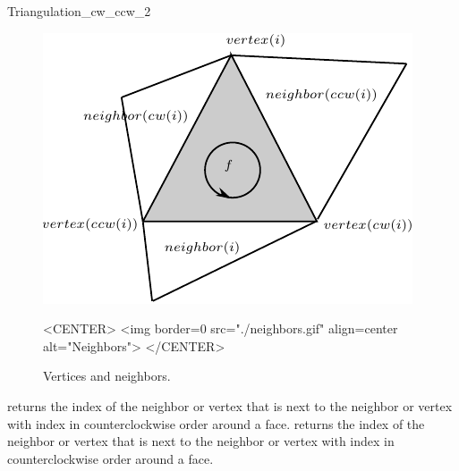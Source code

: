 \begin{ccRefClass}{Triangulation_cw_ccw_2}
 \begin{figure}
\begin{ccTexOnly}
    \begin{center}
     \includegraphics{Triangulation_2/neighbors}
    \end{center}
\end{ccTexOnly} 
    \caption{Vertices and neighbors.
    \label{Triangulation_ref_Fig_neighbors_bis}}
  \begin{ccHtmlOnly}
<CENTER>
<img border=0 src="./neighbors.gif" align=center alt="Neighbors">
</CENTER>
\end{ccHtmlOnly} 
\end{figure}




\ccCreation
{}  %


\ccOperations
{}
{returns the index of the  neighbor or vertex that is  next to 
the neighbor or vertex with index 
in counterclockwise order around a face.}
\ccGlue
{}
{returns the index of the  neighbor or vertex that is  next to 
the neighbor or vertex with index 
in counterclockwise order around a face.}

\ccSeeAlso
{} \\
 \\

\end{ccRefClass}


